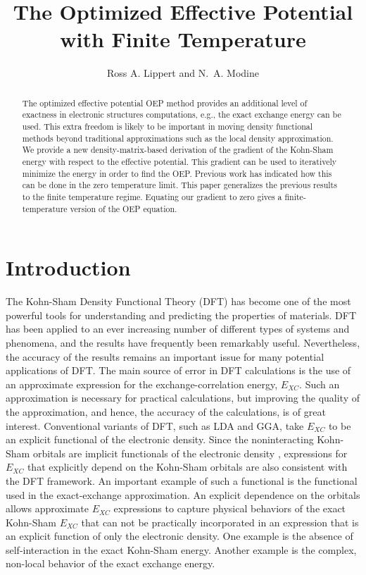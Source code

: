 \documentclass{article}
\title{{\bf The Optimized Effective Potential with Finite Temperature}}
\author{Ross A. Lippert and N.~A. Modine}
\begin{document}
\maketitle

\begin{abstract}
The optimized effective potential OEP method provides an additional level
of exactness in electronic structures computations, e.g., the exact
exchange energy can be used.  This extra freedom is likely to be
important in moving density functional methods beyond traditional
approximations such as the local density approximation.  We provide
a new density-matrix-based derivation of the gradient of the Kohn-Sham
energy with respect to the effective potential.  This gradient can be
used to iteratively minimize the energy in order to find the OEP.
Previous work has indicated how this can be done in the zero temperature
limit.  This paper generalizes the previous results to the finite
temperature regime.  Equating our gradient to zero gives a finite-temperature
version of the OEP equation.
\end{abstract}

\section{Introduction}

The Kohn-Sham Density Functional Theory (DFT) \cite{KohnSham:65} has become one of the
most powerful tools for understanding and predicting the properties of materials.  DFT has
been applied to an ever increasing number of different types of systems and
phenomena, and the results have frequently been remarkably useful.  Nevertheless,
the accuracy of the results remains an important issue for many potential
applications of DFT.  The main source of error in DFT calculations is the use
of an approximate expression for the exchange-correlation energy, $E_{XC}$.
Such an approximation is necessary for practical calculations, but improving
the quality of the approximation, and hence, the accuracy of the calculations,
is of great interest.  Conventional variants of DFT, such as LDA and GGA, take
$E_{XC}$ to be an explicit functional of the electronic density.  Since the
noninteracting Kohn-Sham orbitals are implicit functionals of the electronic
density \cite{HohenbergKohn:64},  expressions for $E_{XC}$ that explicitly
depend on the Kohn-Sham orbitals are also consistent with the DFT framework.
An important example of such a functional is the functional used in the exact-exchange
approximation\cite{TalmanShadwick:76, SahniGruenebaumPerdew:82,EngelVosko:93,GorlingLevy:94,
Kotani:95,StadeleMajewskiVoglGorling:97,Gorling99}.  An explicit dependence
on the orbitals allows approximate $E_{XC}$ expressions to capture physical
behaviors of the exact Kohn-Sham $E_{XC}$ that can not be practically incorporated
in an expression that is an explicit function of only the electronic density.  One
example is the absence of self-interaction in the exact Kohn-Sham energy.
Another example is the complex, non-local behavior of the exact exchange energy.
\end{document}

